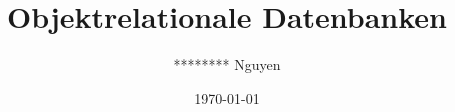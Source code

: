\usepackage[utf8]{inputenc}
\usepackage[T1]{fontenc}
\usepackage{bookmark}

\usepackage{csquotes}
\usepackage{dirtytalk} %
\usepackage{hyperref}
\usepackage{wrapfig}
\usepackage[ngerman]{babel}
\usepackage{adjustbox}
\usepackage{appendixnumberbeamer}

\usepackage[backend=biber,sorting=none]{biblatex}





    \title{Objektrelationale Datenbanken}
    \subtitle{}
    \author{******** Nguyen}
    \date{\today}
